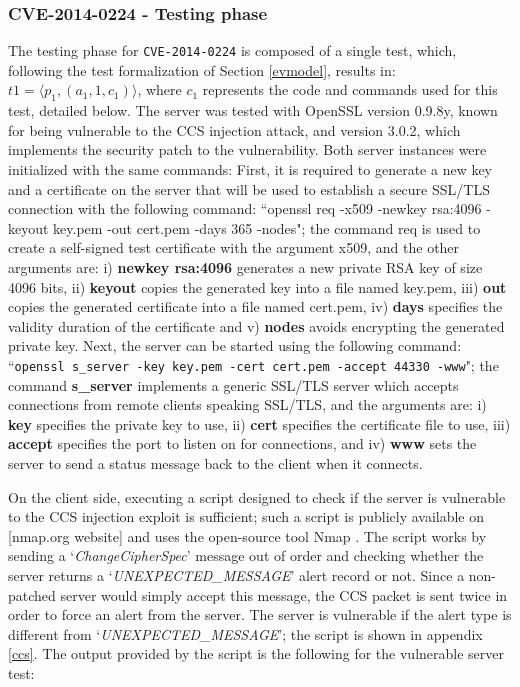 \subsubsection{CVE-2014-0224 - Testing phase}
The testing phase for \texttt{CVE-2014-0224} is composed of a single test, which, following the test formalization of Section \ref{evmodel}, results in: \(t1 = \langle p_1, (a_1, 1, c_1) \rangle\), where \(c_1\) represents the code and commands used for this test, detailed below. The server was tested with OpenSSL version 0.9.8y, known for being vulnerable to the CCS injection attack, and version 3.0.2, which implements the security patch to the vulnerability. Both server instances were initialized with the same commands: First, it is required to generate a new key and a certificate on the server that will be used to establish a secure SSL/TLS connection with the following command:
``openssl req -x509 -newkey rsa:4096 -keyout key.pem -out cert.pem -days 365 -nodes"; the command req is used to create a self-signed test certificate with the argument x509, and the other arguments are: i) \textbf{newkey rsa:4096} generates a new private RSA key of size 4096 bits, ii) \textbf{keyout} copies the generated key into a file named key.pem, iii) \textbf{out} copies the generated certificate into a file named cert.pem, iv) \textbf{days} specifies the validity duration of the certificate and v) \textbf{nodes} avoids encrypting the generated private key.
Next, the server can be started using the following command:
``\texttt{openssl s\_server -key key.pem -cert cert.pem -accept 44330 -www}"; the command \textbf{s\_server} implements a generic SSL/TLS server which accepts connections from remote clients speaking SSL/TLS, and the arguments are: i) \textbf{key} specifies the private key to use, ii) \textbf{cert} specifies the certificate file to use, iii) \textbf{accept} specifies the port to listen on for connections, and iv) \textbf{www} sets the server to send a status message back to the client when it connects.

On the client side, executing a script designed to check if the server is vulnerable to the CCS injection exploit is sufficient; such a script is publicly available on [nmap.org website] and uses the open-source tool Nmap \cite{nmap}. The script works by sending a `\textit{ChangeCipherSpec}' message out of order and checking whether the server returns a `\textit{UNEXPECTED\_MESSAGE}' alert record or not. Since a non-patched server would simply accept this message, the CCS packet is sent twice in order to force an alert from the server. The server is vulnerable if the alert type is different from `\textit{UNEXPECTED\_MESSAGE}'; the script is shown in appendix \ref{ccs}. The output provided by the script is the following for the vulnerable server test:  

